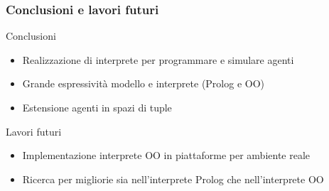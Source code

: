 \documentclass[handout]{beamer}\mode<presentation>{\usetheme{AMSCesenaBleu}}
\begin{document}
\begin{frame}
\frametitle{Conclusioni e lavori futuri}
\begin{block}{Conclusioni}
\begin{itemize}
\item Realizzazione di interprete per programmare e simulare agenti
\item Grande espressività modello e interprete (Prolog e OO)
\item Estensione agenti in spazi di tuple 
\end{itemize}
\end{block}
\begin{block}{Lavori futuri}
\begin{itemize}
\item Implementazione interprete OO in piattaforme per ambiente reale
\item Ricerca per migliorie sia nell'interprete Prolog che nell'interprete OO
\end{itemize}
\end{block}
\end{frame}

\section{}
\subsection{}
\maketitle
\end{document}
